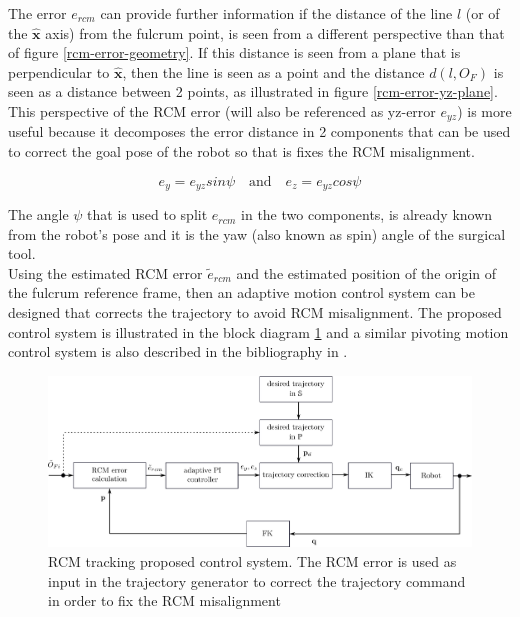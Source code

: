 The error $e_{rcm}$ can provide further information if the distance of the line $l$ (or of the $\mathbf{\hat{x}}$ axis) from the fulcrum point, is seen from a different perspective than that of 
figure \ref{rcm-error-geometry}. If this distance is seen from a plane that is perpendicular to $\mathbf{\hat{x}}$, then the line is seen as a point and the distance $d(l, O_F)$ is seen as a distance between 2 points, 
as illustrated in figure \ref{rcm-error-yz-plane}. This perspective of the RCM error (will also be referenced as yz-error $e_{yz}$) is more useful because it decomposes the error distance in 2 components that can be used to 
correct the goal pose of the robot so that is fixes the RCM misalignment.

\begin{equation}
e_y = e_{yz}sinψ \quad \textrm{and} \quad e_z = e_{yz}cosψ
\end{equation}

The angle $ψ$ that is used to split $e_{rcm}$ in the two components, is already known from the robot's pose and it is the yaw (also known as spin) angle of the surgical tool.\\

Using the estimated RCM error $\tilde{e}_{rcm}$ and the estimated position of the origin of the fulcrum reference frame, then an adaptive motion control system can be designed that corrects the trajectory to avoid RCM 
misalignment. The proposed control system is illustrated in the block diagram \ref{rcm-control-system-block-diagram} and a similar pivoting motion control system is also described in the bibliography 
in \cite{Muoz2005PivotingMC}.

\begin{center}
\begin{figure}[!htb]
\centering
\includegraphics[width=\textwidth]{images/rcm-system-control.png}
\caption{RCM tracking proposed control system. The RCM error is used as input in the trajectory generator to correct the trajectory command in order to fix the RCM misalignment}
\label{rcm-control-system-block-diagram}
\end{figure}
\end{center}


